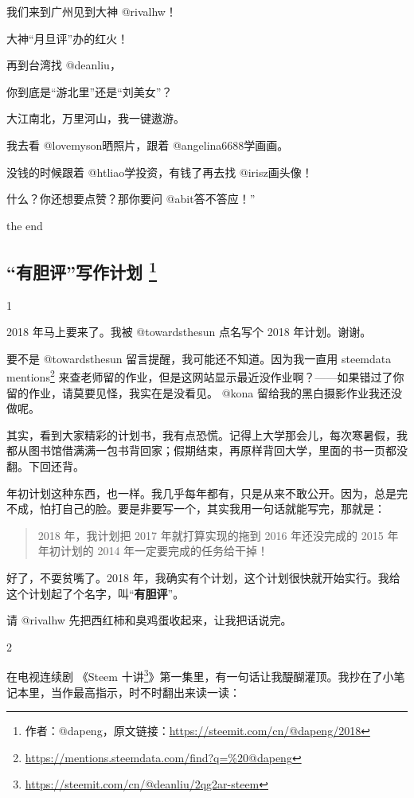 \documentclass[]{ctexbook}
\renewcommand{\href}[2]{#2\footnote{\url{#1}}}
\begin{document}
我们来到广州见到大神 @rivalhw！

大神``月旦评''办的红火！

再到台湾找 @deanliu，

你到底是``游北里''还是``刘美女''？

大江南北，万里河山，我一键遨游。

我去看 @lovemyson晒照片，跟着 @angelina6688学画画。

没钱的时候跟着 @htliao学投资，有钱了再去找 @irisz画头像！

什么？你还想要点赞？那你要问 @abit答不答应！''

the end

\subsection[``有胆评''写作计划 ]{\texorpdfstring{``有胆评''写作计划 \footnote{作者：@dapeng，原文链接：\url{https://steemit.com/cn/@dapeng/2018}}}{``有胆评''写作计划 }}

1

2018 年马上要来了。我被 @towardsthesun 点名写个 2018 年计划。谢谢。

要不是 @towardsthesun 留言提醒，我可能还不知道。因为我一直用 \href{https://mentions.steemdata.com/find?q=\%20@dapeng}{steemdata mentions} 来查老师留的作业，但是这网站显示最近没作业啊？------如果错过了你留的作业，请莫要见怪，我实在是没看见。 @kona 留给我的黑白摄影作业我还没做呢。

其实，看到大家精彩的计划书，我有点恐慌。记得上大学那会儿，每次寒暑假，我都从图书馆借满满一包书背回家；假期结束，再原样背回大学，里面的书一页都没翻。下回还背。

年初计划这种东西，也一样。我几乎每年都有，只是从来不敢公开。因为，总是完不成，怕打自己的脸。要是非要写一个，其实我用一句话就能写完，那就是：

\begin{quote}
2018 年，我计划把 2017 年就打算实现的拖到 2016 年还没完成的 2015 年年初计划的 2014 年一定要完成的任务给干掉！
\end{quote}

好了，不耍贫嘴了。2018 年，我确实有个计划，这个计划很快就开始实行。我给这个计划起了个名字，叫``\textbf{有胆评}''。

请 @rivalhw 先把西红柿和臭鸡蛋收起来，让我把话说完。

2

在电视连续剧 《\href{https://steemit.com/cn/@deanliu/2qg2ar-steem}{Steem 十讲}》第一集里，有一句话让我醍醐灌顶。我抄在了小笔记本里，当作最高指示，时不时翻出来读一读：
\end{document}
